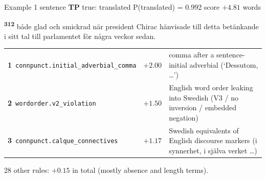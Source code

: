 \begin{exbox}[unbreakable]{Example 1 \quad sentence \quad \textbf{TP} \quad true: translated \quad P(translated) = 0.992 \quad score $+4.81$  words}
{\setlength{\parindent}{0pt}\raggedright {}\textsuperscript{\sffamily\bfseries 3}\highLight[tsT!70]{,}\textsuperscript{\sffamily\bfseries 1}\textsuperscript{\sffamily\bfseries 2} både glad och smickrad när president Chirac hänvisade till detta betänkande i sitt tal till parlamentet för några veckor sedan.}\par{}
\par\medskip
{\footnotesize
\begin{tabularx}{\linewidth}{@{}l r X@{}}
\textbf{1}~\texttt{connpunct.initial\_adverbial\_comma} & $+2.00$ & comma after a sentence-initial adverbial (`Dessutom, \ldots{}') \\
\textbf{2}~\texttt{wordorder.v2\_violation} & $+1.50$ & English word order leaking into Swedish (V3 / no inversion / embedded negation) \\
\textbf{3}~\texttt{connpunct.calque\_connectives} & $+1.17$ & Swedish equivalents of English discourse markers (i synnerhet, i själva verket \ldots{}) \\
\end{tabularx}
\par 28 other rules: $+0.15$ in total (mostly absence and length terms).}
\par{}
\end{exbox}

